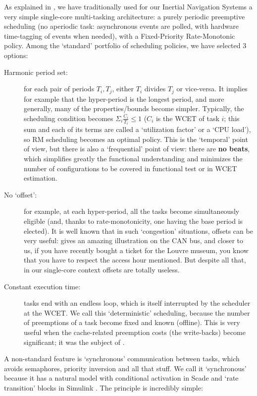 \documentclass[a4paper]{article}
\begin{document}
As explained in \cite{destelle:hal-02267646}, we have traditionally used for our Inertial Navigation Systems a very simple single-core
multi-tasking architecture: a purely periodic preemptive scheduling (no aperiodic task: asynchronous
events are polled, with hardware time-tagging of events when needed), with a Fixed-Priority Rate-Monotonic policy.
Among the ‘standard’ portfolio of scheduling policies, we have selected 3 options:
\begin{description}
\item[Harmonic period set:]
for each pair of periods $T_i, T_j$, either $T_i$ divides $T_j$ or vice-versa. It
implies for example that the hyper-period is the longest period, and more generally, many of the
properties/bounds become simpler. Typically, the scheduling condition becomes
$\Sigma_i \frac{C_i}{T_i} \leq 1$
($C_i$ is the WCET of task $i$; this sum and each of its terms are called a ‘utilization factor’ or a ‘CPU load’),
so RM scheduling becomes an optimal policy. This is the ‘temporal’ point of view, but there is also a
‘frequential’ point of view: there are \textbf{no beats}, which simplifies greatly the functional understanding
and minimizes the number of configurations to be covered in functional test or in WCET estimation.
\item[ No ‘offset’:]
for example, at each hyper-period, all the tasks become simultaneously eligible
(and, thanks to rate-monotonicity, one having the base period is elected).
It is well known that in such ‘congestion’ situations, offsets can be very useful:
\cite{grenier:insu-02270103} gives an amazing illustration on the CAN bus,
and closer to us, if you have recently bought a ticket for the Louvre museum, you know that you have to respect the access hour mentioned.
But despite all that, in our single-core context offsets are totally useless.
\item[Constant execution time:]
tasks end with an endless loop, which is itself interrupted by the scheduler at the WCET.
We call this ‘deterministic’ scheduling, because the
number of preemptions of a task become fixed and known (offline). This is very useful when the
cache-related preemption costs (the write-backs) become significant; it was the subject of \cite{destelle:hal-02267646}.
\end{description}

A non-standard feature is ‘synchronous’ communication between tasks, which
avoids semaphores, priority inversion and all that stuff. We call it ‘synchronous’ because it has a natural model
with conditional activation in Scade \cite{camus:insu-02270095} and ‘rate transition’ blocks in Simulink \cite{DBLP:conf/rtss/MaticH05}.
The principle is incredibly simple:
\end{document}
